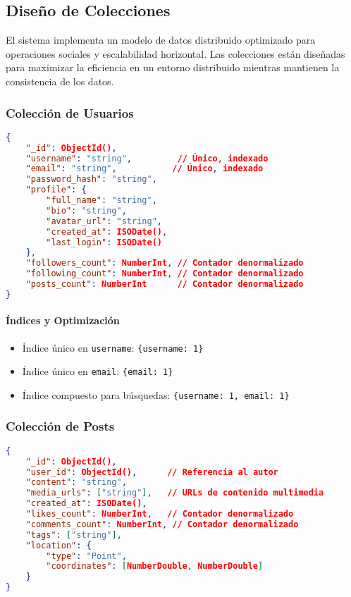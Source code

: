 \documentclass[12pt,letterpaper]{article}
\begin{document}
\subsection{Diseño de Colecciones}
El sistema implementa un modelo de datos distribuido optimizado para operaciones sociales y escalabilidad horizontal. Las colecciones están diseñadas para maximizar la eficiencia en un entorno distribuido mientras mantienen la consistencia de los datos.

\subsubsection{Colección de Usuarios}
\begin{lstlisting}[language=json]
{
    "_id": ObjectId(),
    "username": "string",         // Único, indexado
    "email": "string",           // Único, indexado
    "password_hash": "string",
    "profile": {
        "full_name": "string",
        "bio": "string",
        "avatar_url": "string",
        "created_at": ISODate(),
        "last_login": ISODate()
    },
    "followers_count": NumberInt, // Contador denormalizado
    "following_count": NumberInt, // Contador denormalizado
    "posts_count": NumberInt      // Contador denormalizado
}
\end{lstlisting}

\paragraph{Índices y Optimización}
\begin{itemize}
    \item Índice único en \texttt{username}: \texttt{\{username: 1\}}
    \item Índice único en \texttt{email}: \texttt{\{email: 1\}}
    \item Índice compuesto para búsquedas: \texttt{\{username: 1, email: 1\}}
\end{itemize}

\subsubsection{Colección de Posts}
\begin{lstlisting}[language=json]
{
    "_id": ObjectId(),
    "user_id": ObjectId(),      // Referencia al autor
    "content": "string",
    "media_urls": ["string"],   // URLs de contenido multimedia
    "created_at": ISODate(),
    "likes_count": NumberInt,   // Contador denormalizado
    "comments_count": NumberInt, // Contador denormalizado
    "tags": ["string"],
    "location": {
        "type": "Point",
        "coordinates": [NumberDouble, NumberDouble]
    }
}
\end{lstlisting}
\end{document}
